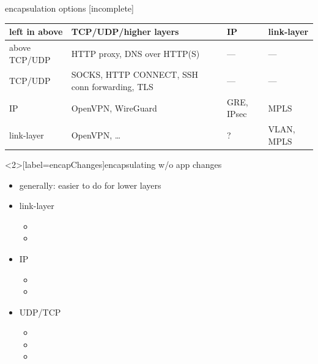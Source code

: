 \begin{frame}{encapsulation options [incomplete]}
\small
\begin{tabular}{l||p{4cm}|p{4cm}|p{2cm}}
left in above       & TCP/UDP/higher layers & IP & link-layer \\ \hline \hline
above TCP/UDP       & HTTP proxy, DNS over HTTP(S) & --- & --- \\ \hline
TCP/UDP             & SOCKS, HTTP CONNECT, SSH conn forwarding, TLS & --- & --- \\\hline
IP                  & OpenVPN, WireGuard & GRE, IPsec & MPLS \\\hline
link-layer          & OpenVPN, \ldots & ? & VLAN, MPLS \\\hline
\end{tabular}
\end{frame}

\begin{frame}<2>[label=encapChanges]{encapsulating w/o app changes}
\begin{itemize}
\item generally: easier to do for lower layers
\vspace{.5cm}
\item link-layer
    \begin{itemize}
    \item {}
    \item {}
    \end{itemize}
\item IP
    \begin{itemize}
    \item {}
    \item {}
    \end{itemize}
\item UDP/TCP
    \begin{itemize}
    \item {}
    \item {}
    \item {}
    \end{itemize}
\end{itemize}
\end{frame}


